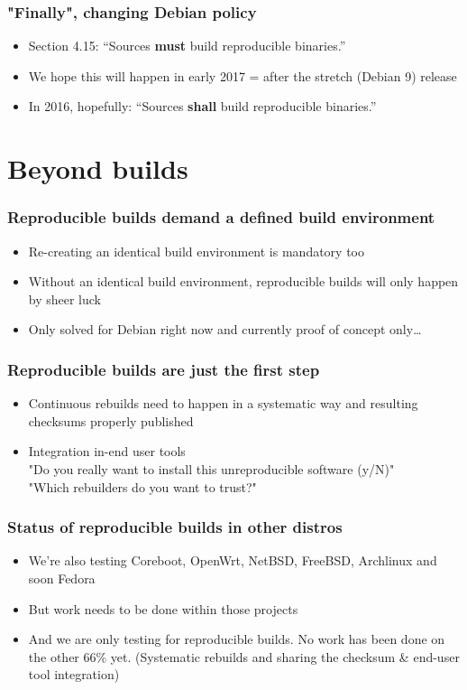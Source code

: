 \documentclass[14pt]{beamer}
\begin{document}
\begin{frame}
 \frametitle{"Finally", changing Debian policy}

 \begin{itemize}
  \item Section 4.15: “Sources \textbf{must} build reproducible binaries.”
  \item<2-3> We hope this will happen in early 2017 = after the stretch
  (Debian 9) release
  \item<3> In 2016, hopefully: “Sources \textbf{shall} build reproducible binaries.”
 \end{itemize}
\end{frame}

\section{Beyond builds}

\begin{frame}
 \frametitle{Reproducible builds demand a defined build environment}
 \begin{itemize}
  \item Re-creating an identical build environment is mandatory too
  \item Without an identical build environment, reproducible builds will only happen by sheer luck
  \item<2>{Only solved for Debian right now and currently proof of concept only…}
 \end{itemize}
\end{frame}

\begin{frame}
 \frametitle{Reproducible builds are just the first step}
 \begin{itemize}
  \item Continuous rebuilds need to happen in a systematic way and resulting checksums properly published
  \item<2> Integration in-end user tools\\
  "Do you really want to install this unreproducible software (y/N)"\\
  "Which rebuilders do you want to trust?"
 \end{itemize}
\end{frame}

\begin{frame}
 \frametitle{Status of reproducible builds in other distros}

 \begin{itemize}
  \item We're also testing Coreboot, OpenWrt, NetBSD, FreeBSD, Archlinux and soon Fedora
  \item But work needs to be done within those projects
  \item<2> And we are only testing for reproducible builds. No work has been done on the other 66\% yet. (Systematic rebuilds and sharing the checksum \& end-user tool integration)
 \end{itemize}
\end{frame}
\end{document}
